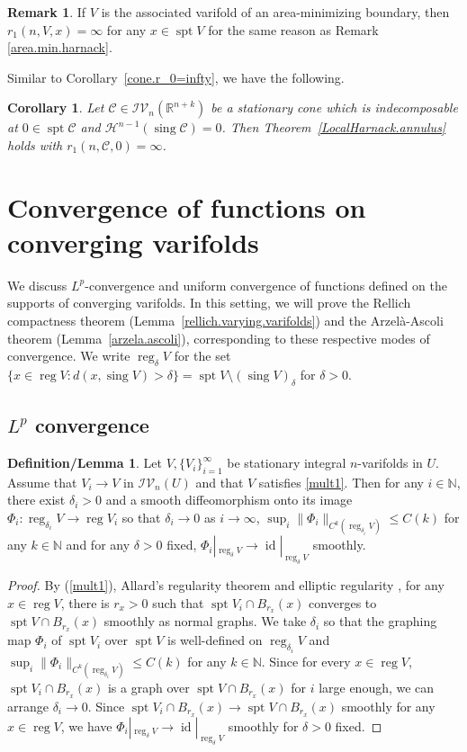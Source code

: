 \documentclass[11pt]{amsart}
\newtheorem{corollary}[theorem]{Corollary}
\theoremstyle{definition}
\newtheorem{remark}[theorem]{Remark}
\newtheorem{defnlem}[theorem]{Definition/Lemma}
\newcommand{\HH}{\mathcal{H}}
\newcommand{\R}{\mathbb{R}}
\newcommand{\N}{\mathbb{N}}
\newcommand{\C}{\mathcal{C}}
\newcommand{\IV}{\mathcal{IV}}
\DeclareMathOperator{\spt}{spt}
\DeclareMathOperator{\sing}{sing}
\DeclareMathOperator{\reg}{reg}
\DeclareMathOperator{\id}{id}
\begin{document}
\begin{remark}
    If $V$ is the associated varifold of an area-minimizing boundary, then $r_1(n,V,x)=\infty$ for any $x\in \spt V$ for the same reason as Remark \ref{area.min.harnack}.
\end{remark}
Similar to Corollary~\ref{cone.r_0=infty}, we have the following.
\begin{corollary}\label{cone.r_1=infty}
    Let $\C\in \IV_n(\R^{n+k})$ be a stationary cone which is indecomposable at $0\in \spt \C$ and $\HH^{n-1}(\sing\C)=0$. Then Theorem~\ref{LocalHarnack.annulus} holds with $r_1(n,\C,0)=\infty$.
\end{corollary}
\section{Convergence of functions on converging varifolds}\label{convergence.of.functions}
We discuss $L^p$-convergence and uniform convergence of functions defined on the supports of converging varifolds. In this setting, we will prove the Rellich compactness theorem (Lemma~\ref{rellich.varying.varifolds}) and the Arzel\`a-Ascoli theorem (Lemma~\ref{arzela.ascoli}), corresponding to these respective modes of convergence. 
We write $\reg_\delta V$ for the set $\{x\in \reg V:d(x,\sing V)> \delta\}=\spt V\setminus(\sing V)_\delta$ for $\delta>0$.

\subsection{\texorpdfstring{$L^p$}{Lp} convergence}


\begin{defnlem}\label{Gromov.Hausdorff.Approximation}
	Let $V,\{V_i\}_{i=1}^\infty$ be stationary integral $n$-varifolds in $U$. Assume that $V_i\to V$ in $\IV_n(U)$ and that $V$ satisfies \eqref{mult1}.  Then for any $i\in \N$, there exist $\delta_i>0$ and a smooth diffeomorphism onto its image $\Phi_i:\reg_{\delta_i} V\to \reg V_i$ so that $\delta_i\to0$ as $i\to \infty$, $\sup_i\|\Phi_i\|_{C^k(\reg_{\delta_i} V)}\le C(k)$ for any $k\in\N$ and for any $\delta>0$ fixed, $\Phi_i|_{\reg_\delta V}\to \id|_{\reg_{\delta}V}$ smoothly.
\end{defnlem}
\begin{proof}
	By (\ref{mult1}), Allard's regularity theorem \cite[Theorem 24.2]{Sim} and elliptic regularity \cite{GT}, for any $x\in \reg V$, there is $r_x>0$  such that $\spt V_i\cap B_{r_x}(x)$ converges to $\spt V\cap B_{r_x}(x)$ smoothly as normal graphs. We take $\delta_i$ so that the graphing map $\Phi_i$ of $\spt V_i$ over $\spt V$ is well-defined on $\reg_{\delta_i} V$ and $\sup_i\|\Phi_i\|_{C^k(\reg_{\delta_i} V)}\le C(k)$ for any $k\in\N$. Since for every $x\in \reg V$, $\spt V_i\cap B_{r_x}(x)$ is a graph over $\spt V\cap B_{r_x}(x)$ for $i$ large enough, we can arrange $\delta_i\to0$. Since $\spt V_i\cap B_{r_x}(x)\to\spt V\cap B_{r_x}(x)$ smoothly for any $x\in \reg V$, we have $\Phi_i|_{\reg_\delta V}\to \id|_{\reg_{\delta}V}$ smoothly for $\delta>0$ fixed.
\end{proof}
\end{document}
